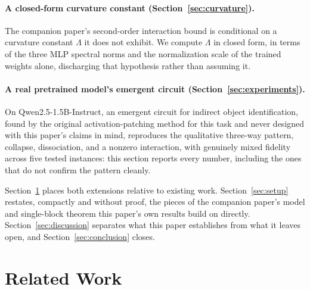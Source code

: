\documentclass[11pt,a4paper]{article}
\begin{document}
\paragraph{A closed-form curvature constant (Section~\ref{sec:curvature}).}
The companion paper's second-order interaction bound is conditional on a
curvature constant $\Lambda$ it does not exhibit. We compute $\Lambda$ in
closed form, in terms of the three MLP spectral norms and the normalization
scale of the trained weights alone, discharging that hypothesis rather than
assuming it.

\paragraph{A real pretrained model's emergent circuit
(Section~\ref{sec:experiments}).} On Qwen2.5-1.5B-Instruct, an emergent
circuit for indirect object identification, found by the original
activation-patching method for this task and never designed with this
paper's claims in mind, reproduces the qualitative three-way pattern,
collapse, dissociation, and a nonzero interaction, with genuinely mixed
fidelity across five tested instances: this section reports every number,
including the ones that do not confirm the pattern cleanly.

\medskip
Section~\ref{sec:related} places both extensions relative to existing work.
Section~\ref{sec:setup} restates, compactly and without proof, the pieces of
the companion paper's model and single-block theorem this paper's own results
build on directly. Section~\ref{sec:discussion} separates what this paper
establishes from what it leaves open, and Section~\ref{sec:conclusion}
closes.

\section{Related Work}
\label{sec:related}
\end{document}
